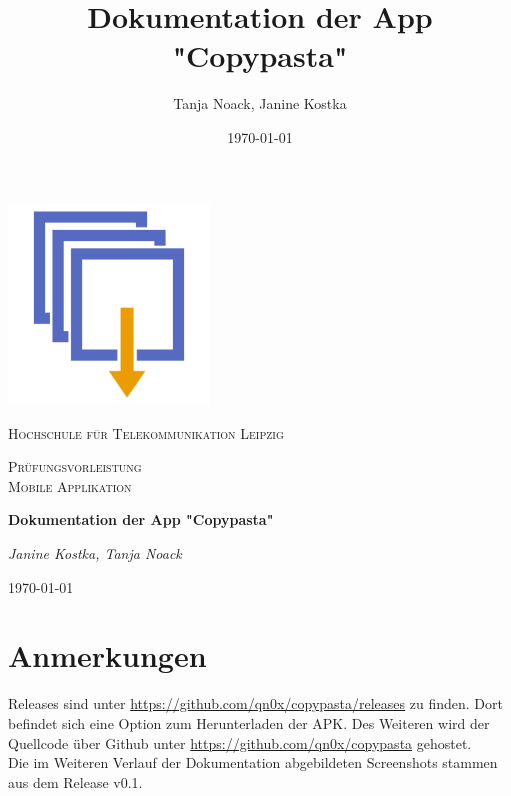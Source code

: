 \documentclass[11pt]{article}
\title{Dokumentation der App "Copypasta"}
\author{Tanja Noack, Janine Kostka}
\date{\today}
\begin{document}
	\begin{titlepage}
		
		
		
		
		\centering
		\includegraphics[width=0.4\textwidth]{Konzepte/logo.png}\par\vspace{1cm}
		{\scshape\LARGE Hochschule für Telekommunikation Leipzig \par}
		\vspace{1cm}
		{\scshape\Large Prüfungsvorleistung \\ Mobile Applikation\par}
		\vspace{1.5cm}
		{\huge\bfseries Dokumentation der App "Copypasta"\par}
		\vspace{2cm}
		{\Large\itshape Janine Kostka, Tanja Noack\par}
		
		\vfill
		
		{\large \today\par}
	\end{titlepage}
	\pagebreak
	
	
	\tableofcontents
	\pagebreak
	
	
	\section*{Anmerkungen}
	Releases sind unter \sloppy\url{https://github.com/qn0x/copypasta/releases} zu finden. Dort befindet sich eine Option zum Herunterladen der APK.  
	Des Weiteren wird der Quellcode über Github unter \sloppy\url{https://github.com/qn0x/copypasta} gehostet. \\
	Die im Weiteren Verlauf der Dokumentation abgebildeten Screenshots stammen aus dem Release v0.1.
	
\end{document}
